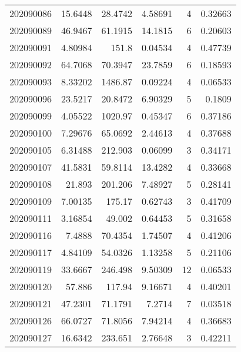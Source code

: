 \begin{tabular}{rrrrrr}
 202090086 &         15.6448  &       28.4742 &            4.58691 &           4 & 0.32663 \\
 202090089 &         46.9467  &       61.1915 &           14.1815  &           6 & 0.20603 \\
 202090091 &          4.80984 &      151.8    &            0.04534 &           4 & 0.47739 \\
 202090092 &         64.7068  &       70.3947 &           23.7859  &           6 & 0.18593 \\
 202090093 &          8.33202 &     1486.87   &            0.09224 &           4 & 0.06533 \\
 202090096 &         23.5217  &       20.8472 &            6.90329 &           5 & 0.1809  \\
 202090099 &          4.05522 &     1020.97   &            0.45347 &           6 & 0.37186 \\
 202090100 &          7.29676 &       65.0692 &            2.44613 &           4 & 0.37688 \\
 202090105 &          6.31488 &      212.903  &            0.06099 &           3 & 0.34171 \\
 202090107 &         41.5831  &       59.8114 &           13.4282  &           4 & 0.33668 \\
 202090108 &         21.893   &      201.206  &            7.48927 &           5 & 0.28141 \\
 202090109 &          7.00135 &      175.17   &            0.62743 &           3 & 0.41709 \\
 202090111 &          3.16854 &       49.002  &            0.64453 &           5 & 0.31658 \\
 202090116 &          7.4888  &       70.4354 &            1.74507 &           4 & 0.41206 \\
 202090117 &          4.84109 &       54.0326 &            1.13258 &           5 & 0.21106 \\
 202090119 &         33.6667  &      246.498  &            9.50309 &          12 & 0.06533 \\
 202090120 &         57.886   &      117.94   &            9.16671 &           4 & 0.40201 \\
 202090121 &         47.2301  &       71.1791 &            7.2714  &           7 & 0.03518 \\
 202090126 &         66.0727  &       71.8056 &            7.94214 &           4 & 0.36683 \\
 202090127 &         16.6342  &      233.651  &            2.76648 &           3 & 0.42211 \\

\end{tabular}

